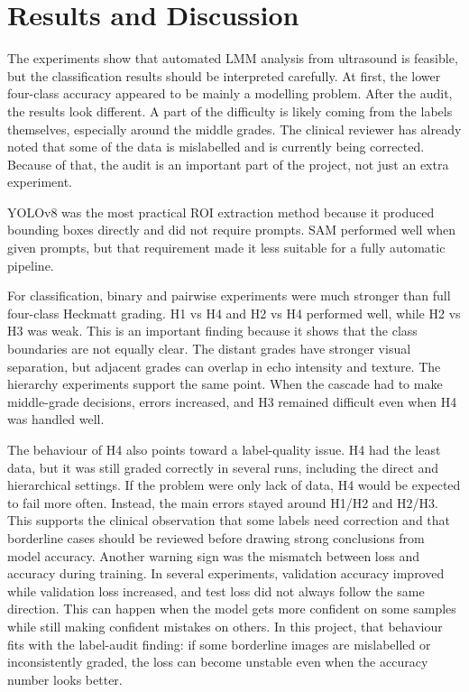 ﻿\documentclass[12pt,a4paper]{report}
\begin{document}
\section{Results and Discussion}
\label{discussion}
The experiments show that automated LMM analysis from ultrasound is feasible, but the classification results should be interpreted carefully. At first, the lower four-class accuracy appeared to be mainly a modelling problem. After the audit, the results look different. A part of the difficulty is likely coming from the labels themselves, especially around the middle grades. The clinical reviewer has already noted that some of the data is mislabelled and is currently being corrected. Because of that, the audit is an important part of the project, not just an extra experiment.

YOLOv8 was the most practical ROI extraction method because it produced bounding boxes directly and did not require prompts. SAM performed well when given prompts, but that requirement made it less suitable for a fully automatic pipeline.

For classification, binary and pairwise experiments were much stronger than full four-class Heckmatt grading. H1 vs H4 and H2 vs H4 performed well, while H2 vs H3 was weak. This is an important finding because it shows that the class boundaries are not equally clear. The distant grades have stronger visual separation, but adjacent grades can overlap in echo intensity and texture. The hierarchy experiments support the same point. When the cascade had to make middle-grade decisions, errors increased, and H3 remained difficult even when H4 was handled well.

The behaviour of H4 also points toward a label-quality issue. H4 had the least data, but it was still graded correctly in several runs, including the direct and hierarchical settings. If the problem were only lack of data, H4 would be expected to fail more often. Instead, the main errors stayed around H1/H2 and H2/H3. This supports the clinical observation that some labels need correction and that borderline cases should be reviewed before drawing strong conclusions from model accuracy.
Another warning sign was the mismatch between loss and accuracy during training. In several experiments, validation accuracy improved while validation loss increased, and test loss did not always follow the same direction. This can happen when the model gets more confident on some samples while still making confident mistakes on others. In this project, that behaviour fits with the label-audit finding: if some borderline images are mislabelled or inconsistently graded, the loss can become unstable even when the accuracy number looks better.
\end{document}
